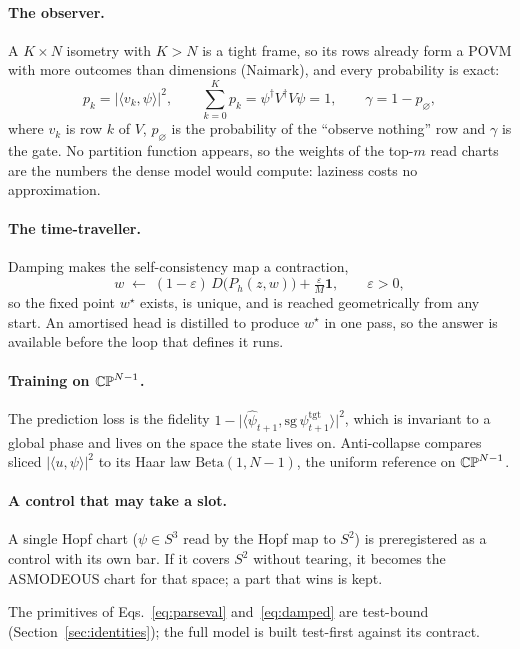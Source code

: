 \paragraph{The observer.} A $K\times N$ isometry with $K>N$ is a tight frame, so its rows already form a POVM with more outcomes than dimensions (Naimark), and every probability is exact:
\begin{equation}\label{eq:parseval}
p_k=\big\lvert\langle v_k,\psi\rangle\big\rvert^2,\qquad \sum_{k=0}^{K}p_k=\psi^\dagger V^\dagger V\psi=1,\qquad \gamma=1-p_\varnothing,
\end{equation}
where $v_k$ is row $k$ of $V$, $p_\varnothing$ is the probability of the ``observe nothing'' row and $\gamma$ is the gate. No partition function appears, so the weights of the top-$m$ read charts are the numbers the dense model would compute: laziness costs no approximation.

\paragraph{The time-traveller.} Damping makes the self-consistency map a contraction,
\begin{equation}\label{eq:damped}
w\;\leftarrow\;(1-\varepsilon)\,D\big(P_h(z,w)\big)+\tfrac{\varepsilon}{M}\mathbf{1},\qquad \varepsilon>0,
\end{equation}
so the fixed point $w^\star$ exists, is unique, and is reached geometrically from any start. An amortised head is distilled to produce $w^\star$ in one pass, so the answer is available before the loop that defines it runs.

\paragraph{Training on $\mathbb{CP}^{N-1}$.} The prediction loss is the fidelity $1-\lvert\langle\hat\psi_{t+1},\mathrm{sg}\,\psi^{\mathrm{tgt}}_{t+1}\rangle\rvert^2$, which is invariant to a global phase and lives on the space the state lives on. Anti-collapse compares sliced $\lvert\langle u,\psi\rangle\rvert^2$ to its Haar law $\mathrm{Beta}(1,N-1)$, the uniform reference on $\mathbb{CP}^{N-1}$.

\paragraph{A control that may take a slot.} A single Hopf chart ($\psi\in S^3$ read by the Hopf map to $S^2$) is preregistered as a control with its own bar. If it covers $S^2$ without tearing, it becomes the ASMODEOUS chart for that space; a part that wins is kept.

The primitives of Eqs.~\eqref{eq:parseval} and~\eqref{eq:damped} are test-bound (Section~\ref{sec:identities}); the full model is built test-first against its contract.

